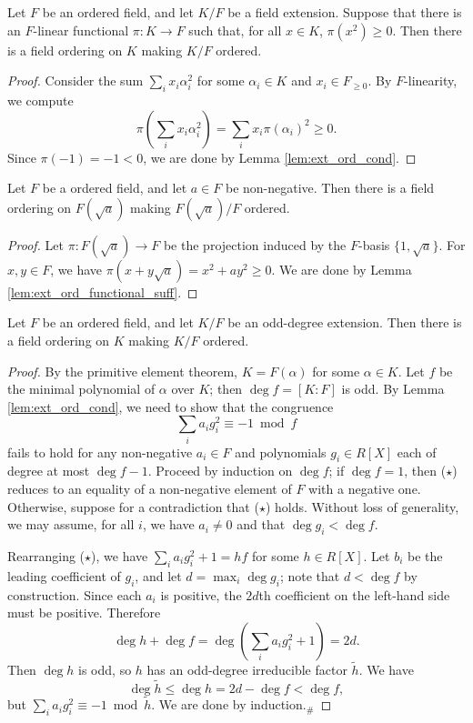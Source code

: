 \begin{lemma}
  \label{lem:ext_ord_functional_suff}
  Let $F$ be an ordered field, and let $K/F$ be a field extension. Suppose that there is an $F$-linear functional $\pi:K\to F$ such that, for all $x\in K$, $\pi(x^2)\geq0$. Then there is a field ordering on $K$ making $K/F$ ordered.
\end{lemma}
\begin{proof}
  Consider the sum $\sum_i x_i\alpha_i^2$ for some $\alpha_i\in K$ and $x_i\in F_{\geq0}$. By $F$-linearity, we compute
  \[\pi(\sum_i x_i\alpha_i^2)=\sum_i x_i\pi(\alpha_i)^2\geq0.\]
  Since $\pi(-1)=-1<0$, we are done by Lemma \ref{lem:ext_ord_cond}.
\end{proof}

\begin{corollary}
  \label{cor:ext_ord_to_adj_sqrt}
  Let $F$ be a ordered field, and let $a\in F$ be non-negative. Then there is a field ordering on $F(\sqrt{a})$ making $F(\sqrt{a})/F$ ordered.
\end{corollary}
\begin{proof}
  Let $\pi:F(\sqrt{a})\to F$ be the projection induced by the $F$-basis $\{1,\sqrt{a}\}$. For $x,y\in F$, we have $\pi(x+y\sqrt{a})=x^2+ay^2\geq0$. We are done by Lemma \ref{lem:ext_ord_functional_suff}.
\end{proof}

\begin{lemma}
  \label{lem:ext_ord_odd_deg}
  Let $F$ be an ordered field, and let $K/F$ be an odd-degree extension. Then there is a field ordering on $K$ making $K/F$ ordered.
\end{lemma}
\begin{proof}
  By the primitive element theorem, $K=F(\alpha)$ for some $\alpha\in K$. Let $f$ be the minimal polynomial of $\alpha$ over $K$; then $\deg f=[K:F]$ is odd. By Lemma \ref{lem:ext_ord_cond}, we need to show that the congruence
  \[\sum_ia_ig_i^2\equiv-1\bmod f\tag{$\star$}\]
  fails to hold for any non-negative $a_i\in F$ and polynomials $g_i\in R[X]$ each of degree at most $\deg f-1$. Proceed by induction on $\deg f$; if $\deg f=1$, then ($\star$) reduces to an equality of a non-negative element of $F$ with a negative one. Otherwise, suppose for a contradiction that ($\star$) holds. Without loss of generality, we may assume, for all $i$, we have $a_i\neq0$ and that $\deg g_i<\deg f$.
  
  Rearranging ($\star$), we have $\sum_ia_ig_i^2+1=hf$ for some $h\in R[X]$. Let $b_i$ be the leading coefficient of $g_i$, and let $d=\max_i\deg g_i$; note that $d<\deg f$ by construction. Since each $a_i$ is positive, the $2d$th coefficient on the left-hand side must be positive. Therefore
  \[\deg h+\deg f=\deg(\sum_ia_ig_i^2+1)=2d.\]
  Then $\deg h$ is odd, so $h$ has an odd-degree irreducible factor $\tilde h$. We have
  \[\deg\tilde h\leq\deg h=2d-\deg f<\deg f,\]
  but $\sum_ia_ig_i^2\equiv-1\bmod\tilde h$. We are done by induction.$_\#$
\end{proof}

